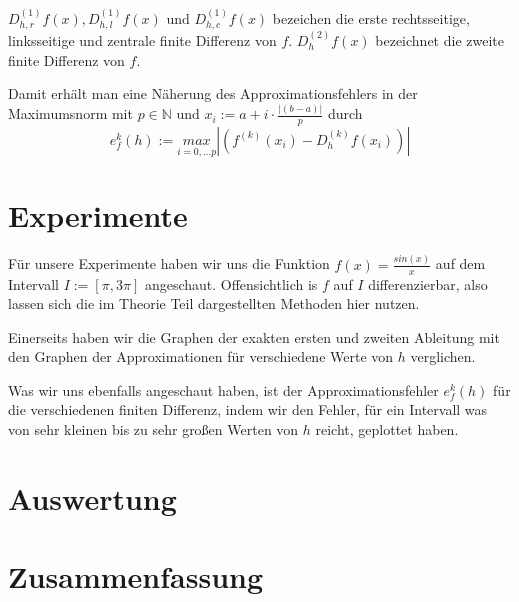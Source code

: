 \documentclass{scrartcl}
\theoremstyle{remark}
\begin{document}
\(D_{h, r}^{(1)}f(x), D_{h, l}^{(1)}f(x) \text{ und } D_{h, c}^{(1)}f(x)\) bezeichen die erste rechtsseitige, linksseitige und zentrale finite Differenz von \(f\).
\(D_{h}^{(2)}f(x)\) bezeichnet die zweite finite Differenz von \(f\).

Damit erhält man eine Näherung des Approximationsfehlers in der Maximumsnorm mit \(p \in \mathbb{N} \text{ und } x_{i} := a + i\cdot\frac{|(b - a)|}{p}\) durch
\[e_{f}^{k}(h) := \underset{i = 0, \dots p}{max}|(f^{(k)}(x_{i}) - D_{h}^{(k)}f(x_{i}))|\]

\section{Experimente}
Für unsere Experimente haben wir uns die Funktion \(f(x) = \frac{sin(x)}{x}\) auf dem Intervall \(I :=[\pi, 3\pi]\) angeschaut. Offensichtlich is \(f\) auf \(I\) differenzierbar, also
lassen sich die im Theorie Teil dargestellten Methoden hier nutzen.

Einerseits haben wir die Graphen der exakten ersten und zweiten Ableitung mit den Graphen der Approximationen für verschiedene Werte von \(h\) verglichen.


Was wir uns ebenfalls angeschaut haben, ist der Approximationsfehler \(e_{f}^{k}(h)\) für die verschiedenen finiten Differenz, indem wir den Fehler, für ein Intervall
was von sehr kleinen bis zu sehr großen Werten von \(h\) reicht, geplottet haben.





\section{Auswertung}



\section{Zusammenfassung}




\printbibliography
\end{document}
